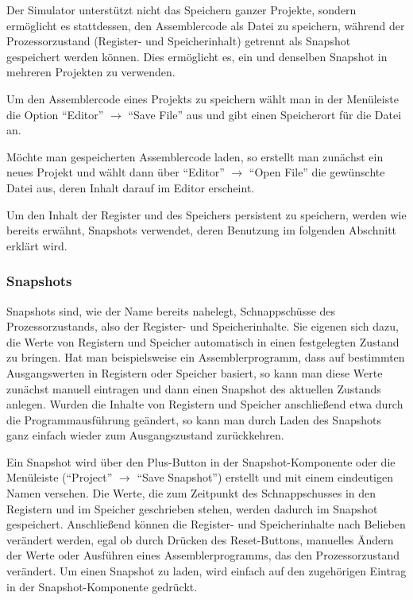 Der Simulator unterstützt nicht das Speichern ganzer Projekte, sondern
ermöglicht es stattdessen, den Assemblercode als Datei zu speichern, während der
Prozessorzustand (Register- und Speicherinhalt) getrennt als Snapshot
gespeichert werden können. Dies ermöglicht es, ein und denselben Snapshot in
mehreren Projekten zu verwenden.

Um den Assemblercode eines Projekts zu speichern wählt man in der Menüleiste die
Option ``Editor'' $\rightarrow$ ``Save File'' aus und gibt einen Speicherort für
die Datei an.

Möchte man gespeicherten Assemblercode laden, so erstellt man zunächst ein neues
Projekt und wählt dann über ``Editor'' $\rightarrow$ ``Open File'' die
gewünschte Datei aus, deren Inhalt darauf im Editor erscheint.

Um den Inhalt der Register und des Speichers persistent zu speichern, werden wie
bereits erwähnt, Snapshots verwendet, deren Benutzung im folgenden Abschnitt
erklärt wird.

\subsubsection{Snapshots}

Snapshots sind, wie der Name bereits nahelegt, Schnappschüsse des
Prozessorzustands, also der Register- und Speicherinhalte. Sie eigenen sich
dazu, die Werte von Registern und Speicher automatisch in einen festgelegten
Zustand zu bringen. Hat man beispielsweise ein Assemblerprogramm, dass auf
bestimmten Ausgangswerten in Registern oder Speicher basiert, so kann man diese
Werte zunächst manuell eintragen und dann einen Snapshot des aktuellen Zustands
anlegen. Wurden die Inhalte von Registern und Speicher anschließend etwa durch
die Programmausführung geändert, so kann man durch Laden des Snapshots ganz
einfach wieder zum Ausgangszustand zurückkehren.

Ein Snapshot wird über den Plus-Button in der Snapshot-Komponente oder die
Menüleiste (``Project'' $\rightarrow$ ``Save Snapshot'') erstellt und mit einem
eindeutigen Namen versehen. Die Werte, die zum Zeitpunkt des Schnappschusses in
den Registern und im Speicher geschrieben stehen, werden dadurch im Snapshot
gespeichert. Anschließend können die Register- und Speicherinhalte nach Belieben
verändert werden, egal ob durch Drücken des Reset-Buttons, manuelles Ändern der
Werte oder Ausführen eines Assemblerprogramms, das den Prozessorzustand
verändert. Um einen Snapshot zu laden, wird einfach auf den zugehörigen Eintrag
in der Snapshot-Komponente gedrückt.

